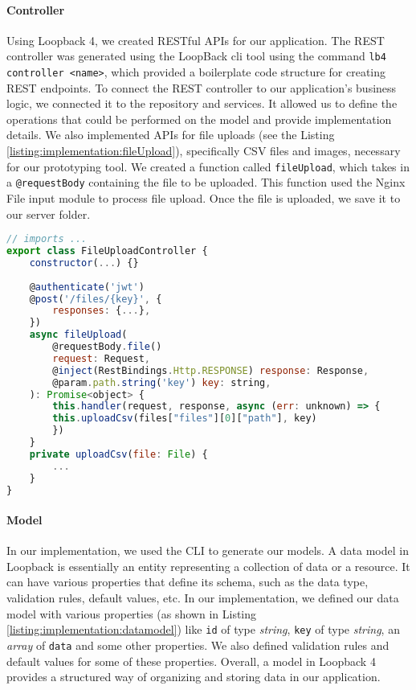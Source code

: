 \paragraph{Controller}
Using Loopback 4, we created RESTful APIs for our application. 
The REST controller was generated using the LoopBack \ac{cli} tool using the command \texttt{lb4 controller <name>}, which provided a boilerplate code structure for creating REST endpoints.
To connect the REST controller to our application's business logic, we connected it to the repository and services. 
It allowed us to define the operations that could be performed on the model and provide implementation details.
We also implemented APIs for file uploads (see the Listing \ref{listing:implementation:fileUpload}), specifically CSV files and images, necessary for our prototyping tool. 
We created a function called \texttt{fileUpload}, which takes in a \texttt{@requestBody} containing the file to be uploaded. 
This function used the Nginx File input module to process file upload. 
Once the file is uploaded, we save it to our server folder.

\begin{lstlisting}[language=JavaScript, caption=The Typescript File for the Rest Controller for File Upload, label=listing:implementation:fileUpload]
// imports ...
export class FileUploadController {
    constructor(...) {}
    
    @authenticate('jwt')
    @post('/files/{key}', {
        responses: {...},
    })
    async fileUpload(
        @requestBody.file()
        request: Request,
        @inject(RestBindings.Http.RESPONSE) response: Response,
        @param.path.string('key') key: string,
    ): Promise<object> {
        this.handler(request, response, async (err: unknown) => {
        this.uploadCsv(files["files"][0]["path"], key)
        })
    }
    private uploadCsv(file: File) {
        ...
    }
}
\end{lstlisting}

\paragraph{Model}
In our implementation, we used the CLI to generate our models.
A data model in Loopback is essentially an entity representing a collection of data or a resource. It can have various properties that define its schema, such as the data type, validation rules, default values, etc.
In our implementation, we defined our data model with various properties (as shown in Listing \ref{listing:implementation:datamodel}) like \texttt{id} of type \textit{string}, \texttt{key} of type \textit{string}, an \textit{array} of \texttt{data} and some other properties.
We also defined validation rules and default values for some of these properties.
Overall, a model in Loopback 4 provides a structured way of organizing and storing data in our application.


